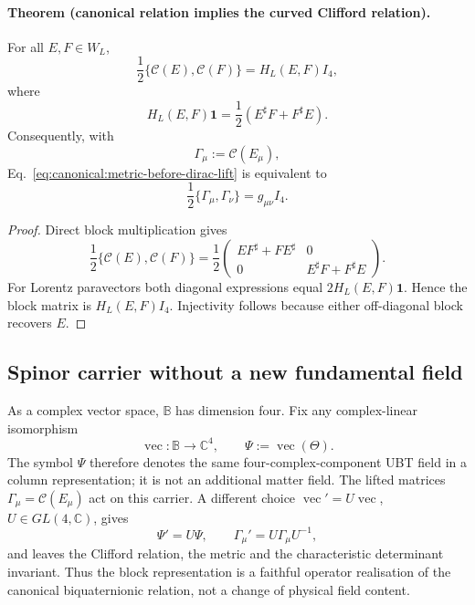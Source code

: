 \paragraph{Theorem (canonical relation implies the curved Clifford relation).}
For all $E,F\in W_L$,
\begin{equation}
 \frac12\{\mathcal C(E),\mathcal C(F)\}
 =H_L(E,F)I_4,
 \label{eq:canonical:block-clifford-identity}
\end{equation}
where
\begin{equation}
 H_L(E,F)\mathbf1
 =\frac12(E^\sharp F+F^\sharp E).
\end{equation}
Consequently, with
\begin{equation}
 \Gamma_\mu:=\mathcal C(E_\mu),
\end{equation}
Eq.~\eqref{eq:canonical:metric-before-dirac-lift} is equivalent to
\begin{equation}
 \boxed{\frac12\{\Gamma_\mu,\Gamma_\nu\}=g_{\mu\nu}I_4.}
 \label{eq:canonical:curved-clifford-relation}
\end{equation}

\begin{proof}
Direct block multiplication gives
\begin{equation}
 \frac12\{\mathcal C(E),\mathcal C(F)\}
 =\frac12
 \begin{pmatrix}
 EF^\sharp+FE^\sharp&0\\
 0&E^\sharp F+F^\sharp E
 \end{pmatrix}.
\end{equation}
For Lorentz paravectors both diagonal expressions equal
$2H_L(E,F)\mathbf1$.  Hence the block matrix is
$H_L(E,F)I_4$.  Injectivity follows because either off-diagonal block recovers
$E$.
\end{proof}


\subsection{Spinor carrier without a new fundamental field}
As a complex vector space, $\mathbb B$ has dimension four.  Fix any complex-linear
isomorphism
\begin{equation}
 \operatorname{vec}:\mathbb B\longrightarrow\mathbb C^4,
 \qquad \Psi:=\operatorname{vec}(\Theta).
\end{equation}
The symbol $\Psi$ therefore denotes the same four-complex-component UBT field
in a column representation; it is not an additional matter field.  The lifted
matrices $\Gamma_\mu=\mathcal C(E_\mu)$ act on this carrier.  A different
choice $\operatorname{vec}'=U\operatorname{vec}$, $U\in GL(4,\mathbb C)$,
gives
\begin{equation}
 \Psi'=U\Psi,
 \qquad
 \Gamma_\mu'=U\Gamma_\mu U^{-1},
\end{equation}
and leaves the Clifford relation, the metric and the characteristic
determinant invariant.  Thus the block representation is a faithful operator
realisation of the canonical biquaternionic relation, not a change of physical
field content.

